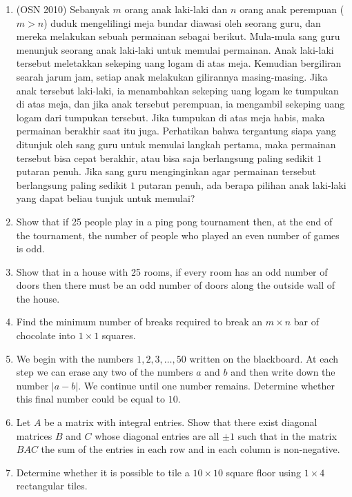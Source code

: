 \documentclass[11pt]{scrartcl}
\begin{document}
\begin{enumerate}
\item (OSN 2010) Sebanyak $m$ orang anak laki-laki dan $n$ orang anak perempuan ($m > n$) duduk mengelilingi meja bundar diawasi oleh seorang guru, dan mereka melakukan sebuah permainan sebagai berikut. Mula-mula sang guru menunjuk seorang anak laki-laki untuk memulai permainan. Anak laki-laki tersebut meletakkan sekeping uang logam di atas meja. Kemudian bergiliran searah jarum jam, setiap anak melakukan gilirannya masing-masing. Jika anak tersebut laki-laki, ia menambahkan sekeping uang logam ke tumpukan di atas meja, dan jika anak tersebut perempuan, ia mengambil sekeping uang logam dari tumpukan tersebut. Jika tumpukan di atas meja habis, maka permainan berakhir saat itu juga. Perhatikan bahwa tergantung siapa yang ditunjuk oleh sang guru untuk memulai langkah pertama, maka permainan tersebut bisa cepat berakhir, atau bisa saja berlangsung paling sedikit $1$ putaran penuh.
Jika sang guru menginginkan agar permainan tersebut berlangsung paling sedikit $1$ putaran penuh, ada berapa pilihan anak laki-laki yang dapat beliau tunjuk untuk memulai?

\item Show that if 25 people play in a ping pong tournament then, at the end of the tournament, the number of people who played an even number of games is odd.

\item Show that in a house with 25 rooms, if every room has an odd number of doors then there must be an odd number of doors along the outside wall of the house.

\item Find the minimum number of breaks required to break an $m \times n$ bar of chocolate into $1 \times 1$ squares.

\item We begin with the numbers $1, 2, 3, \ldots , 50$ written on the blackboard. At each step we can erase any two of the numbers $a$ and $b$ and then write down the number $|a-b|$. We continue until one number remains. Determine whether this final number could be equal to $10$.

\item Let $A$ be a matrix with integral entries. Show that there exist diagonal matrices $B$ and $C$ whose diagonal entries are all $\pm1$ such that in the matrix $BAC$ the sum of the entries in each row and in each column is non-negative.

\item Determine whether it is possible to tile a $10 \times 10$ square floor using $1 \times 4$ rectangular tiles.


\end{enumerate}
\end{document}
